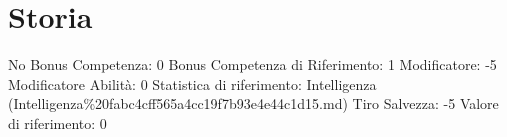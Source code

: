\section{Storia}\label{storia}

\begin{description}
\tightlist
\item[Tags: ABI]
No Bonus Competenza: 0 Bonus Competenza di Riferimento: 1 Modificatore:
-5 Modificatore Abilità: 0 Statistica di riferimento: Intelligenza
(Intelligenza\%20fabc4cff565a4cc19f7b93e4e44c1d15.md) Tiro Salvezza: -5
Valore di riferimento: 0
\end{description}
